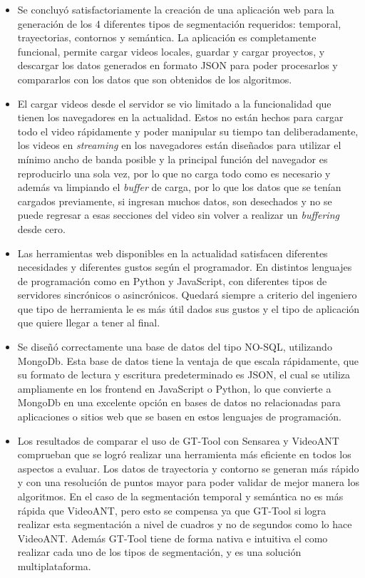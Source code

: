 \begin{itemize}
	
\item Se concluyó satisfactoriamente la creación de una aplicación web para la generación de los 4 diferentes tipos de segmentación requeridos: temporal, trayectorias, contornos y semántica. La aplicación es completamente funcional, permite cargar videos locales, guardar y cargar proyectos, y descargar los datos generados en formato JSON para poder procesarlos y compararlos con los datos que son obtenidos de los algoritmos.

\item El cargar videos desde el servidor se vio limitado a la funcionalidad que tienen los navegadores en la actualidad. Estos no están hechos para cargar todo el video rápidamente y poder manipular su tiempo tan deliberadamente, los videos en \emph{streaming} en los navegadores están diseñados para utilizar el mínimo ancho de banda posible y la principal función del navegador es reproducirlo una sola vez, por lo que no carga todo como es necesario y además va limpiando el \emph{buffer} de carga, por lo que los datos que se tenían cargados previamente, si ingresan muchos datos, son desechados y no se puede regresar a esas secciones del video sin volver a realizar un \emph{buffering} desde cero.

\item Las herramientas web disponibles en la actualidad satisfacen diferentes necesidades y diferentes gustos según el programador. En distintos lenguajes de programación como en Python y JavaScript, con diferentes tipos de servidores sincrónicos o asincrónicos. Quedará siempre a criterio del ingeniero que tipo de herramienta le es más útil dados sus gustos y el tipo de aplicación que quiere llegar a tener al final.

\item Se diseñó correctamente una base de datos del tipo NO-SQL, utilizando MongoDb. Esta base de datos tiene la ventaja de que escala rápidamente, que su formato de lectura y escritura predeterminado es JSON, el cual se utiliza ampliamente en los frontend en JavaScript o Python, lo que convierte a MongoDb en una excelente opción en bases de datos no relacionadas para aplicaciones o sitios web que se basen en estos lenguajes de programación.

\item Los resultados de comparar el uso de GT-Tool con Sensarea y VideoANT comprueban que se logró realizar una herramienta más eficiente en todos los aspectos a evaluar. Los datos de trayectoria y contorno se generan más rápido y con una resolución de puntos mayor para poder validar de mejor manera los algoritmos. En el caso de la segmentación temporal y semántica no es más rápida que VideoANT, pero esto se compensa ya que GT-Tool si logra realizar esta segmentación a nivel de cuadros y no de segundos como lo hace VideoANT. Además GT-Tool tiene de forma nativa e intuitiva el como realizar cada uno de los tipos de segmentación, y es una solución multiplataforma.


\end{itemize}
